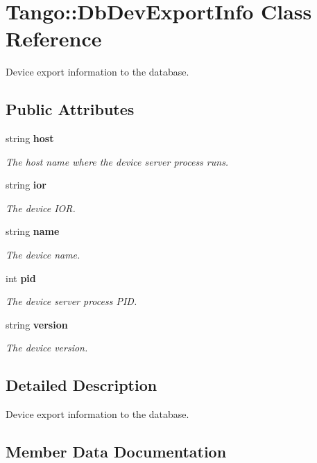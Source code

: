 \section{Tango\-:\-:Db\-Dev\-Export\-Info Class Reference}
\label{classTango_1_1DbDevExportInfo}


Device export information to the database.  


\subsection*{Public Attributes}
\begin{DoxyCompactItemize}
\item 
string {\bf host}
\begin{DoxyCompactList}\small\item\em The host name where the device server process runs. \end{DoxyCompactList}\item 
string {\bf ior}
\begin{DoxyCompactList}\small\item\em The device I\-O\-R. \end{DoxyCompactList}\item 
string {\bf name}
\begin{DoxyCompactList}\small\item\em The device name. \end{DoxyCompactList}\item 
int {\bf pid}
\begin{DoxyCompactList}\small\item\em The device server process P\-I\-D. \end{DoxyCompactList}\item 
string {\bf version}
\begin{DoxyCompactList}\small\item\em The device version. \end{DoxyCompactList}\end{DoxyCompactItemize}


\subsection{Detailed Description}
Device export information to the database. 

\subsection{Member Data Documentation}
